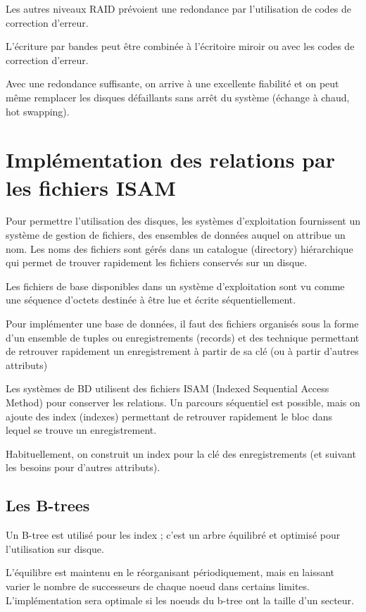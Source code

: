 	Les autres niveaux RAID prévoient une redondance par l'utilisation de codes de correction d'erreur.
	
	L'écriture par bandes peut être combinée à l'écritoire miroir ou avec les codes de correction d'erreur.
	
	Avec une redondance suffisante, on arrive à une excellente fiabilité et on peut même remplacer les disques défaillants sans arrêt du système (échange à chaud, hot swapping).
	
	
	\section{Implémentation des relations par les fichiers ISAM}
	
	Pour permettre l'utilisation des disques, les systèmes d'exploitation fournissent un système de gestion de fichiers, des ensembles de données auquel on attribue un nom. Les noms des fichiers sont gérés dans un catalogue (directory) hiérarchique qui permet de trouver rapidement les fichiers conservés sur un disque.
	
	Les fichiers de base disponibles dans un système d'exploitation sont vu comme une séquence d'octets destinée à être lue et écrite séquentiellement.
	
	Pour implémenter une base de données, il faut des fichiers organisés sous la forme d'un ensemble de tuples ou enregistrements (records) et des technique permettant de retrouver rapidement un enregistrement à partir de sa clé (ou à partir d'autres attributs)
	
		
	Les systèmes de BD utilisent des fichiers ISAM (Indexed Sequential Access Method) pour conserver les relations. Un parcours séquentiel est possible, mais on ajoute des index (indexes) permettant de retrouver rapidement le bloc dans lequel se trouve un enregistrement.
		
	Habituellement, on construit un index pour la clé des enregistrements (et suivant les besoins pour d'autres attributs).
	
	
		\subsection{Les B-trees}
		
		Un B-tree est utilisé pour les index ; c'est un arbre équilibré et optimisé pour l'utilisation sur disque.
		
		L'équilibre est maintenu en le réorganisant périodiquement, mais en laissant varier le nombre de successeurs de chaque noeud dans certains limites. L'implémentation sera optimale si les noeuds du b-tree ont la taille d'un secteur.
		
